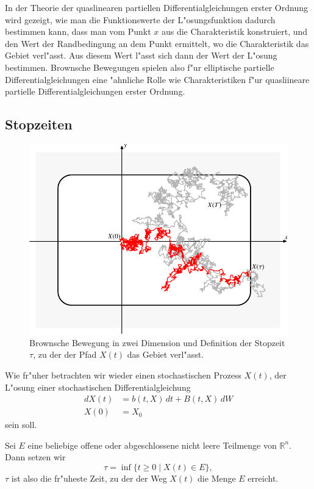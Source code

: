 In der Theorie der quaslinearen partiellen Differentialgleichungen erster
Ordnung wird gezeigt, wie man die Funktionswerte der L"osungsfunktion
dadurch bestimmen kann, dass man vom Punkt $x$ aus die Charakteristik 
konstruiert, und den Wert der Randbedingung an dem Punkt ermittelt,
wo die Charakteristik das Gebiet verl"asst.
Aus diesem Wert l"asst sich dann der Wert der L"osung bestimmen.
Brownsche Bewegungen spielen also f"ur elliptische partielle
Differentialgleichungen eine "ahnliche Rolle wie Charakteristiken f"ur
quasliineare partielle Differentialgleichungen erster Ordnung.

\subsection{Stopzeiten}
\begin{figure}
\centering
\includegraphics{chapters/images/stochastisch-2.pdf}
\caption{Brownsche Bewegung in zwei Dimension und Definition der
Stopzeit $\tau$, zu der der Pfad $X(t)$ das Gebiet verl"asst.
\label{stochastisch:pfad}}
\end{figure}%
Wie fr"uher betrachten wir wieder einen stochastischen Prozess $X(t)$,
der L"osung einer stochastischen Differentialgleichung
\begin{equation}
\begin{aligned}
dX(t)&=b(t,X)\,dt + B(t,X)\,dW
\\
X(0)&=X_0
\end{aligned}
\label{stochastisch:stopzeitdgl}
\end{equation}
sein soll.

\begin{definition}
Sei $E$ eine beliebige offene oder abgeschlossene nicht leere Teilmenge
von $\mathbb R^n$.
Dann setzen wir
\[
\tau = \inf\{t\ge 0\;|\;X(t)\in E\},
\]
$\tau$ ist also die fr"uheste Zeit, zu der der Weg $X(t)$ die Menge $E$
erreicht.
\end{definition}

